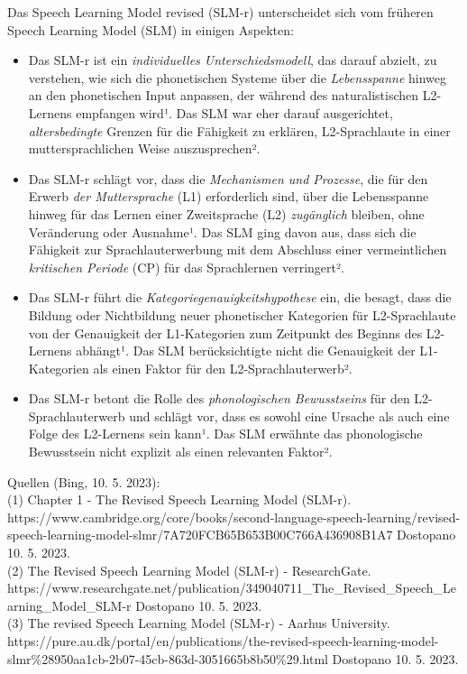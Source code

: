 \documentclass[
  letterpaper,
]{scrbook}
\providecommand{\tightlist}{%
  \setlength{\itemsep}{0pt}\setlength{\parskip}{0pt}}\usepackage{longtable,booktabs,array}
\begin{document}
Das Speech Learning Model revised (SLM-r) unterscheidet sich vom
früheren Speech Learning Model (SLM) in einigen Aspekten:

\begin{itemize}
\tightlist
\item
  Das SLM-r ist ein \emph{individuelles Unterschiedsmodell}, das darauf
  abzielt, zu verstehen, wie sich die phonetischen Systeme über die
  \emph{Lebensspanne} hinweg an den phonetischen Input anpassen, der
  während des naturalistischen L2-Lernens empfangen wird¹. Das SLM war
  eher darauf ausgerichtet, \emph{altersbedingte} Grenzen für die
  Fähigkeit zu erklären, L2-Sprachlaute in einer muttersprachlichen
  Weise auszusprechen².\\
\item
  Das SLM-r schlägt vor, dass die \emph{Mechanismen und Prozesse}, die
  für den Erwerb \emph{der Muttersprache} (L1) erforderlich sind, über
  die Lebensspanne hinweg für das Lernen einer Zweitsprache (L2)
  \emph{zugänglich} bleiben, ohne Veränderung oder Ausnahme¹. Das SLM
  ging davon aus, dass sich die Fähigkeit zur Sprachlauterwerbung mit
  dem Abschluss einer vermeintlichen \emph{kritischen Periode} (CP) für
  das Sprachlernen verringert².\\
\item
  Das SLM-r führt die \emph{Kategoriegenauigkeitshypothese} ein, die
  besagt, dass die Bildung oder Nichtbildung neuer phonetischer
  Kategorien für L2-Sprachlaute von der Genauigkeit der L1-Kategorien
  zum Zeitpunkt des Beginns des L2-Lernens abhängt¹. Das SLM
  berücksichtigte nicht die Genauigkeit der L1-Kategorien als einen
  Faktor für den L2-Sprachlauterwerb².\\
\item
  Das SLM-r betont die Rolle des \emph{phonologischen Bewusstseins} für
  den L2-Sprachlauterwerb und schlägt vor, dass es sowohl eine Ursache
  als auch eine Folge des L2-Lernens sein kann¹. Das SLM erwähnte das
  phonologische Bewusstsein nicht explizit als einen relevanten Faktor².
\end{itemize}

Quellen (Bing, 10. 5. 2023):\\
(1) Chapter 1 - The Revised Speech Learning Model (SLM-r).
https://www.cambridge.org/core/books/second-language-speech-learning/revised-speech-learning-model-slmr/7A720FCB65B653B00C766A436908B1A7
Dostopano 10. 5. 2023.\\
(2) The Revised Speech Learning Model (SLM-r) - ResearchGate.
https://www.researchgate.net/publication/349040711\_The\_Revised\_Speech\_Learning\_Model\_SLM-r
Dostopano 10. 5. 2023.\\
(3) The revised Speech Learning Model (SLM-r) - Aarhus University.
https://pure.au.dk/portal/en/publications/the-revised-speech-learning-model-slmr\%28950aa1cb-2b07-45cb-863d-3051665b8b50\%29.html
Dostopano 10. 5. 2023.
\end{document}
